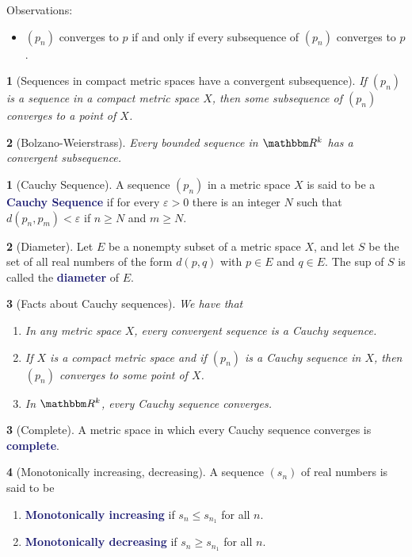 \documentclass[12pt]{article}
\numberwithin{equation}{section}
\newcommand{\navy}[1]{\textcolor{MidnightBlue}{\bf #1}}
\theoremstyle{plain}
\newtheorem{theorem}{\color{ForestGreen}{\textbf{Theorem}}}[section]
\theoremstyle{definition}
\newtheorem{definition}{\color{MidnightBlue}{\textbf{Definition}}}[section]
\newcommand{\1}{\mathbbm 1}
\newcommand{\e}{\varepsilon}
\newcommand{\RR}{\mathbbm R}
\begin{document}
Observations:
\begin{itemize}
	\item $(p_n)$ converges to $p$ if and only if every subsequence of $(p_n)$ converges to $p$. 
\end{itemize}

\begin{theorem}[Sequences in compact metric spaces have a convergent subsequence]
	If $(p_n)$ is a sequence in a compact metric space $X$, then some subsequence of $(p_n)$ converges to a point of $X$.
\end{theorem}

\begin{theorem}[Bolzano-Weierstrass]
	Every bounded sequence in $\RR^k$ has a convergent subsequence.
\end{theorem}

\begin{definition}[Cauchy Sequence]
	A sequence $(p_n)$ in a metric space $X$ is said to be a \navy{Cauchy Sequence} if for every $\e > 0$ there is an integer $N$ such that $d(p_n, p_m) < \e$ if $n \geq N$ and $m \geq N$.
\end{definition}

\begin{definition}[Diameter]
	Let $E$ be a nonempty subset of a metric space $X$, and let $S$ be the set of all real numbers of the form $d(p,q)$ with $p \in E$ and $q \in E$. The sup of $S$ is called the \navy{diameter} of $E$.
\end{definition}

\begin{theorem}[Facts about Cauchy sequences]
	We have that
\begin{enumerate}
	\item In any metric space $X$, every convergent sequence is a Cauchy sequence.
	\item If $X$ is a compact metric space and if $(p_n)$ is a Cauchy sequence in $X$, then $(p_n)$ converges to some point of $X$.
	\item In $\RR^k$, every Cauchy sequence converges. 
\end{enumerate}
\end{theorem}

\begin{definition}[Complete]
	A metric space in which every Cauchy sequence converges is \navy{complete}.
\end{definition}

\begin{definition}[Monotonically increasing, decreasing]
	A sequence $(s_n)$ of real numbers is said to be
	\begin{enumerate}
		\item \navy{Monotonically increasing} if $s_n \leq s_{n_1}$ for all $n$.
		\item \navy{Monotonically decreasing} if $s_n \geq s_{n_1}$ for all $n$.
	\end{enumerate}
\end{definition}
\end{document}
